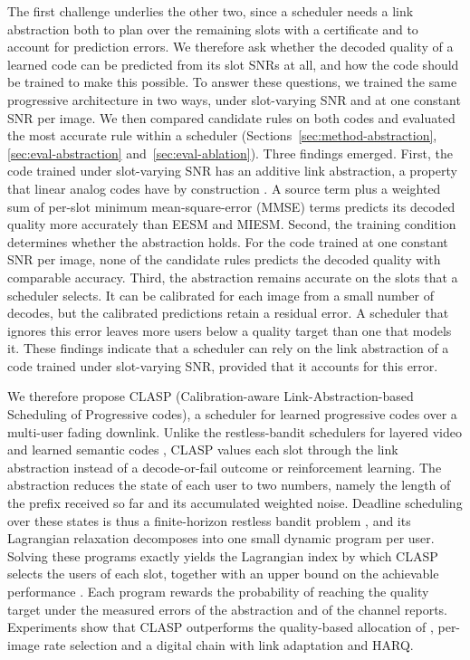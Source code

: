 The first challenge underlies the other two, since a scheduler needs a link abstraction both to plan
over the remaining slots with a certificate and to account for prediction errors. We therefore ask
whether the decoded quality of a learned code can be predicted from its slot SNRs at all, and how
the code should be trained to make this possible. To answer these questions, we trained the same
progressive architecture in two ways, under slot-varying SNR and at one constant SNR per image. We
then compared candidate rules on both codes and evaluated the most accurate rule within a scheduler
(Sections~\ref{sec:method-abstraction}, \ref{sec:eval-abstraction} and~\ref{sec:eval-ablation}).
Three findings emerged. First, the code trained under slot-varying SNR has an additive link
abstraction, a property that linear analog codes have by construction \cite{Jakubczak11}. A source
term plus a weighted sum of per-slot minimum mean-square-error (MMSE) terms predicts its decoded
quality more accurately than EESM and MIESM. Second, the training condition determines whether the
abstraction holds. For the code trained at one constant SNR per image, none of the candidate rules
predicts the decoded quality with comparable accuracy. Third, the abstraction remains accurate on
the slots that a scheduler selects. It can be calibrated for each image from a small number of
decodes, but the calibrated predictions retain a residual error. A scheduler that ignores this error
leaves more users below a quality target than one that models it. These findings indicate that a
scheduler can rely on the link abstraction of a code trained under slot-varying SNR, provided that
it accounts for this error.

We therefore propose CLASP (Cal\-i\-bra\-tion-aware Link-Ab\-strac\-tion-based Scheduling of
Progressive codes), a scheduler for learned progressive codes over a multi-user fading downlink.
Unlike the restless-bandit schedulers for layered video \cite{Hosseini19} and learned semantic codes
\cite{McDowell26}, CLASP values each slot through the link abstraction instead of a decode-or-fail
outcome or reinforcement learning. The abstraction reduces the state of each user to two numbers,
namely the length of the prefix received so far and its accumulated weighted noise. Deadline
scheduling over these states is thus a finite-horizon restless bandit problem \cite{Whittle88}, and
its Lagrangian relaxation decomposes into one small dynamic program per user. Solving these programs
exactly yields the Lagrangian index by which CLASP selects the users of each slot, together with an
upper bound on the achievable performance \cite{Brown20,Hao22}. Each program rewards the probability
of reaching the quality target under the measured errors of the abstraction and of the channel
reports. Experiments show that CLASP outperforms the quality-based allocation of
\cite{Yan22,Xia24,Hou26}, per-image rate selection and a digital chain with link adaptation and HARQ.

